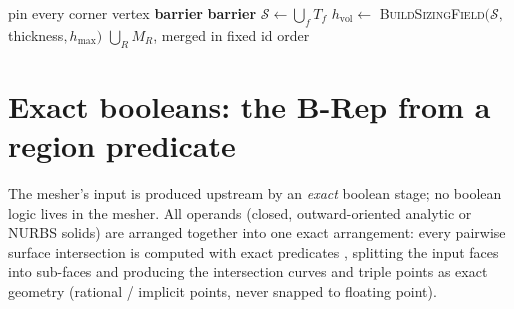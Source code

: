 \documentclass[11pt,a4paper]{article}
\numberwithin{equation}{section}
\begin{document}
\begin{algorithm}[H]
\caption{\textsc{Mesh}$(\mathcal{B},h_{\max},\varepsilon)$ -- top-level driver}
\label{alg:mesh}
pin every corner vertex\hfill{}\;
\textbf{barrier}\;
\textbf{barrier}\;
$\mathcal{S}\gets\bigcup_f T_f$ \hfill{}\;
$h_{\text{vol}}\gets$ \textsc{BuildSizingField}$(\mathcal{S},\,$thickness$,h_{\max})$\;
\Return $\bigcup_R M_R$, merged in fixed id order\;
\end{algorithm}

\section{Exact booleans: the B-Rep from a region predicate}
\label{sec:booleans}
The mesher's input is produced upstream by an \emph{exact} boolean stage; no
boolean logic lives in the mesher. All operands (closed, outward-oriented
analytic or NURBS solids) are arranged together into one exact arrangement: every
pairwise surface intersection is computed with exact predicates
\cite{Shewchuk1997}, splitting the input faces into sub-faces and producing the
intersection curves and triple points as exact geometry (rational / implicit
points, never snapped to floating point).
\end{document}
